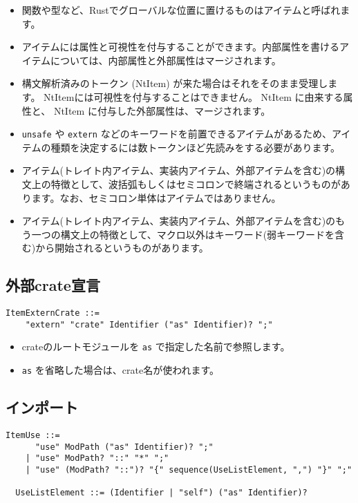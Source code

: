 \documentclass[dvipdfmx,uplatex,papersize,a4paper,10pt]{jsbook}
\theoremstyle{definition}
\begin{document}
\begin{itemize}
  \item 関数や型など、Rustでグローバルな位置に置けるものはアイテムと呼ばれます。
  \item アイテムには属性と可視性を付与することができます。内部属性を書けるアイテムについては、内部属性と外部属性はマージされます。
  \item 構文解析済みのトークン (NtItem) が来た場合はそれをそのまま受理します。 NtItemには可視性を付与することはできません。 NtItem に由来する属性と、 NtItem に付与した外部属性は、マージされます。
  \item \verb|unsafe| や \verb|extern| などのキーワードを前置できるアイテムがあるため、アイテムの種類を決定するには数トークンほど先読みをする必要があります。
  \item アイテム(トレイト内アイテム、実装内アイテム、外部アイテムを含む)の構文上の特徴として、波括弧もしくはセミコロンで終端されるというものがあります。なお、セミコロン単体はアイテムではありません。
  \item アイテム(トレイト内アイテム、実装内アイテム、外部アイテムを含む)のもう一つの構文上の特徴として、マクロ以外はキーワード(弱キーワードを含む)から開始されるというものがあります。
\end{itemize}

\subsection{外部crate宣言}

\begin{lstlisting}[language=BNFLike, gobble=2]
  ItemExternCrate ::=
    "extern" "crate" Identifier ("as" Identifier)? ";"
\end{lstlisting}

\begin{itemize}
  \item crateのルートモジュールを \verb|as| で指定した名前で参照します。
  \item \verb|as| を省略した場合は、crate名が使われます。
\end{itemize}

\subsection{インポート}

\begin{lstlisting}[language=BNFLike, gobble=2]
  ItemUse ::=
      "use" ModPath ("as" Identifier)? ";"
    | "use" ModPath? "::" "*" ";"
    | "use" (ModPath? "::")? "{" sequence(UseListElement, ",") "}" ";"

  UseListElement ::= (Identifier | "self") ("as" Identifier)?
\end{lstlisting}
\end{document}
